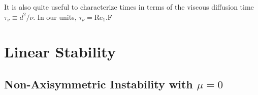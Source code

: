 \documentclass[openacc]{rstransa}%
\newcommand{\Reyn}{\mathrm{Re}}
\begin{document}
It is also quite useful to characterize times in terms of the viscous diffusion time $\tau_\nu \equiv d^2/\nu$. In our units, $\tau_\nu = \Reyn_1$.F
\section{Linear Stability}
\label{sec:linear}
\subsection{Non-Axisymmetric Instability with $\mu = 0$}
%
%
%
\end{document}
